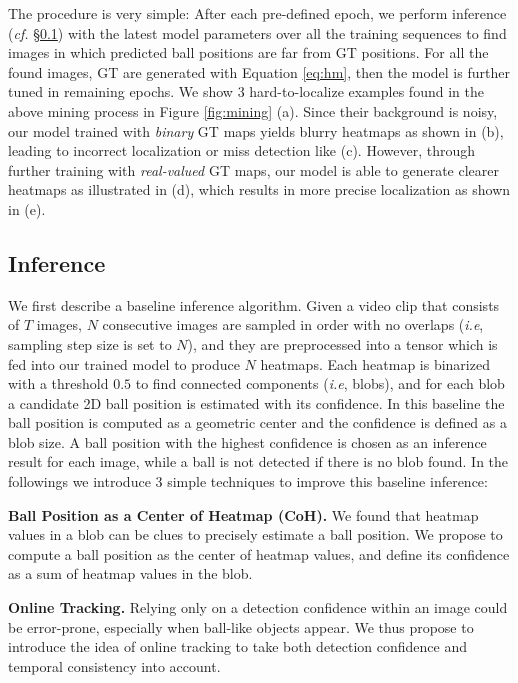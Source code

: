 \documentclass{bmvc2k}
\def\ie{\emph{i.e}\bmvaOneDot}
\begin{document}
The procedure is very simple:
After each pre-defined epoch,
we perform inference ({\it cf.} \S \ref{sec:method:infer}) with the latest model parameters over all the training sequences to find images in which predicted ball positions are far from GT positions.
For all the found images, GT are generated with Equation \ref{eq:hm}, then the model is further tuned in remaining epochs.
We show 3 hard-to-localize examples found in the above mining process in Figure \ref{fig:mining} (a).
Since their background is noisy, our model trained with {\it binary} GT maps yields blurry heatmaps as shown in (b), leading to incorrect localization or miss detection like (c).
However, through further training with {\it real-valued} GT maps, our model is able to generate clearer heatmaps as illustrated in (d), which results in more precise localization as shown in (e).
\subsection{Inference}
\label{sec:method:infer}
We first describe a baseline inference algorithm.
Given a video clip that consists of $T$ images, $N$ consecutive images are sampled in order with no overlaps (\ie, sampling step size is set to $N$), and they are preprocessed into a tensor which is fed into our trained model to produce $N$ heatmaps.
Each heatmap is binarized with a threshold $0.5$ to find connected components (\ie, blobs), and for each blob a candidate 2D ball position is estimated with its confidence.
In this baseline the ball position is computed as a geometric center and the confidence is defined as a blob size.
A ball position with the highest confidence is chosen as an inference result for each image,
while a ball is not detected if there is no blob found.
In the followings we introduce 3 simple techniques to improve this baseline inference:
\par
\vspace{1mm}
\noindent \textbf{Ball Position as a Center of Heatmap (CoH).}
We found that heatmap values in a blob can be clues to precisely estimate a ball position.
We propose to compute a ball position as the center of heatmap values, and define its confidence as a sum of heatmap values in the blob.
\par
\vspace{1mm}
\noindent \textbf{Online Tracking.}
Relying only on a detection confidence within an image could be error-prone, especially when ball-like objects appear.
We thus propose to introduce the idea of online tracking to take both detection confidence and temporal consistency into account.
\end{document}

